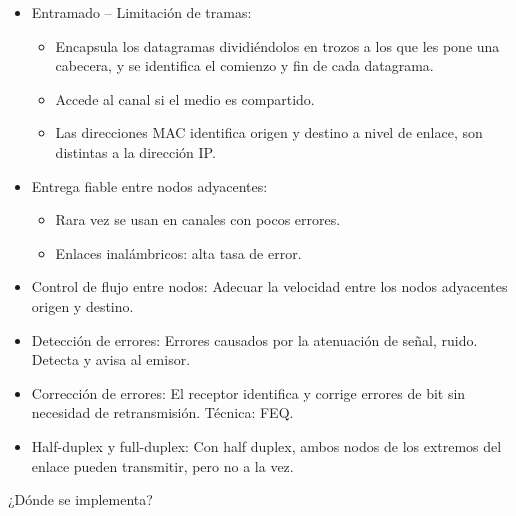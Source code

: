 \documentclass[12pt, twoside, openright]{report} %
\begin{document}
\begin{itemize}
	\item Entramado -- Limitación de tramas:

	      \begin{itemize}
		      \item Encapsula los datagramas dividiéndolos en trozos a los que les
		            pone una cabecera, y se identifica el comienzo y fin de cada
		            datagrama.
		      \item Accede al canal si el medio es compartido.
		      \item Las direcciones MAC identifica origen y destino a nivel de
		            enlace, son distintas a la dirección IP.
	      \end{itemize}
	\item Entrega fiable entre nodos adyacentes:

	      \begin{itemize}
		      \item Rara vez se usan en canales con pocos errores.
		      \item Enlaces inalámbricos: alta tasa de error.
	      \end{itemize}
	\item Control de flujo entre nodos: Adecuar la velocidad entre los nodos
	      adyacentes origen y destino.
	\item Detección de errores: Errores causados por la atenuación de señal,
	      ruido. Detecta y avisa al emisor.
	\item Corrección de errores: El receptor identifica y corrige errores de
	      bit sin necesidad de retransmisión. Técnica: FEQ.
	\item Half-duplex y full-duplex: Con half duplex, ambos nodos de los
	      extremos del enlace pueden transmitir, pero no a la vez.
\end{itemize}

¿Dónde se implementa?
\end{document}
